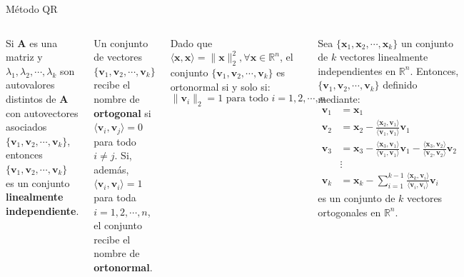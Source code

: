 \documentclass[9pt, aspectratio=169]{beamer}
\begin{document}
\begin{frame}{Método QR}
\begin{columns}[t]
\cx
\begin{theorem}
    Si $\bm{A}$ es una matriz y $\lambda_1, \lambda_2, \cdots, \lambda_k$ son autovalores distintos de $\bm{A}$ con autovectores asociados $\{ \bm{v}_1, \bm{v}_2, \cdots,\bm{v}_k \}$, entonces $\{ \bm{v}_1, \bm{v}_2, \cdots,\bm{v}_k\}$ es un conjunto \textbf{linealmente independiente}.
\end{theorem} \pause

\begin{definition}
    Un conjunto de vectores $\{\bm{v}_1, \bm{v}_2, \cdots,\bm{v}_k\}$ recibe el nombre de \textbf{ortogonal} si $\langle \bm{v}_i, \bm{v}_j \rangle = 0$ para todo $i \neq j$. Si, además, $\langle \bm{v}_i, \bm{v}_i \rangle = 1$ para toda $i = 1, 2, \cdots, n$, el conjunto recibe el nombre de \textbf{ortonormal}.
\end{definition}

Dado que $\langle \bm{x}, \bm{x} \rangle = \lVert \bm{x} \rVert_2^2, \forall \bm{x} \in \mathbb{R}^n$, el conjunto $\{\bm{v}_1, \bm{v}_2, \cdots,\bm{v}_k\}$ es ortonormal si y solo si:\[ \lVert \bm{v}_i \rVert_2 = 1 \text{ para todo } i = 1, 2, \cdots, n \]
\pause

\cx
\begin{theorem}
    Sea $\{ \bm{x}_1, \bm{x}_2, \cdots, \bm{x}_k \}$ un conjunto de $k$ vectores linealmente independientes en $\mathbb{R}^n$. Entonces, $\{ \bm{v}_1, \bm{v}_2, \cdots, \bm{v}_k \}$ definido mediante:
    \begin{align*}
        \bm{v}_1 &= \bm{x}_1  \\
        \bm{v}_2 &= \bm{x}_2 - \frac{\langle \bm{x}_2, \bm{v}_1 \rangle }{\langle \bm{v}_1, \bm{v}_1 \rangle} \bm{v}_1 \\ 
        \bm{v}_3 &= \bm{x}_3 - \frac{\langle \bm{x}_3, \bm{v}_1 \rangle }{\langle \bm{v}_1, \bm{v}_1 \rangle } \bm{v}_1 - \frac{\langle \bm{x}_3, \bm{v}_2 \rangle }{\langle \bm{v}_2, \bm{v}_2 \rangle } \bm{v}_2 \\ 
                 &\vdots \\
        \bm{v}_k &= \bm{x}_k - \sum_{i=1}^{k-1} \frac{\langle \bm{x}_k, \bm{v}_i \rangle }{\langle \bm{v}_i, \bm{v}_i \rangle } \bm{v}_i  
    \end{align*}
    es un conjunto de $k$ vectores ortogonales en $\mathbb{R}^n$.
\end{theorem}
\end{columns}
\end{frame}
\end{document}
